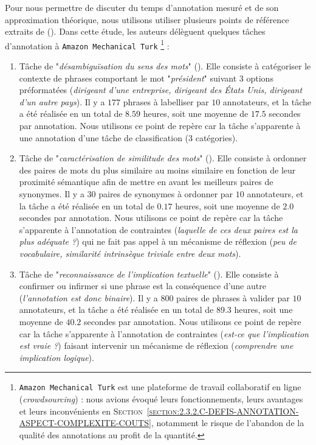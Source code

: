 			Pour nous permettre de discuter du temps d'annotation mesuré et de son approximation théorique, nous utilisons utiliser plusieurs points de référence extraits de (\cite{snow-etal:2008:cheap-fast-it}).
			Dans cette étude, les auteurs délèguent quelques tâches d'annotation à \texttt{Amazon Mechanical Turk} \footnote{
				\texttt{Amazon Mechanical Turk} est une plateforme de travail collaboratif en ligne (\textit{crowdsourcing}) : nous avions évoqué leurs fonctionnements, leurs avantages et leurs inconvénients en \textsc{Section~\ref{section:2.3.2.C-DEFIS-ANNOTATION-ASPECT-COMPLEXITE-COUTS}}, notamment le risque de l'abandon de la qualité des annotations au profit de la quantité.
			} :
			
			\begin{enumerate}
				\item Tâche de "\textit{désambiguïsation du sens des mots}" (\cite{pradhan-etal:2007:semeval2007-task-17}).
				Elle consiste à catégoriser le contexte de phrases comportant le mot "\textit{président}" suivant $3$ options préformatées (\textit{dirigeant d'une entreprise, dirigeant des États Unis, dirigeant d'un autre pays}).
				Il y a $177$ phrases à labelliser par $10$ annotateurs, et la tâche a été réalisée en un total de $8.59$ heures, soit une moyenne de $17.5$ secondes par annotation.
				Nous utilisons ce point de repère car la tâche s'apparente à une annotation d'une tâche de classification ($3$ catégories).
				\item Tâche de "\textit{caractérisation de similitude des mots}" (\cite{miller-charles:1991:contextual-correlates-semantic}).
				Elle consiste à ordonner des paires de mots du plus similaire au moins similaire en fonction de leur proximité sémantique afin de mettre en avant les meilleurs paires de synonymes.
				Il y a $30$ paires de synonymes à ordonner par $10$ annotateurs, et la tâche a été réalisée en un total de $0.17$ heures, soit une moyenne de $2.0$ secondes par annotation.
				Nous utilisons ce point de repère car la tâche s'apparente à l'annotation de contraintes (\textit{laquelle de ces deux paires est la plus adéquate ?}) qui ne fait pas appel à un mécanisme de réflexion (\textit{peu de vocabulaire, similarité intrinsèque triviale entre deux mots}).
				\item Tâche de "\textit{reconnaissance de l'implication textuelle}" (\cite{dagan-etal:2005:pascal-recognising-textual}).
				Elle consiste à confirmer ou infirmer si une phrase est la conséquence d'une autre (\textit{l'annotation est donc binaire}).
				Il y a $800$ paires de phrases à valider par $10$ annotateurs, et la tâche a été réalisée en un total de $89.3$ heures, soit une moyenne de $40.2$ secondes par annotation.
				Nous utilisons ce point de repère car la tâche s'apparente à l'annotation de contraintes (\textit{est-ce que l'implication est vraie ?}) faisant intervenir un mécanisme de réflexion (\textit{comprendre une implication logique}).
			\end{enumerate}
